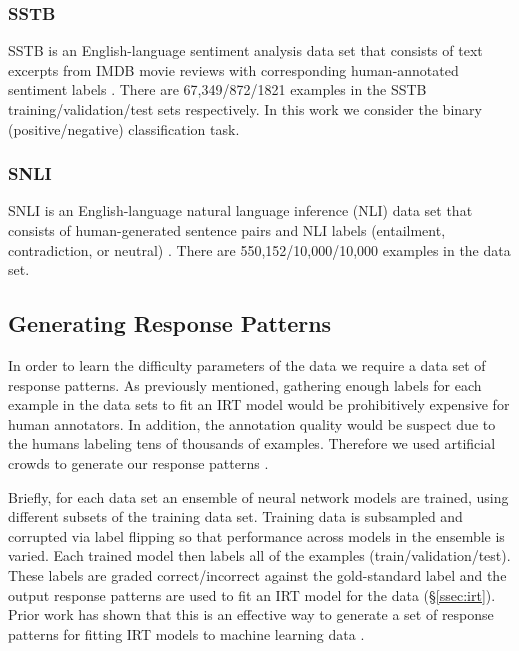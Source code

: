 \documentclass[letterpaper]{article} %
\begin{document}
\subsubsection{SSTB} 

SSTB is an English-language sentiment analysis data set that consists of text excerpts from IMDB movie reviews with corresponding human-annotated sentiment labels \cite{socher_recursive_2013}.
There are 67,349/872/1821 examples in the SSTB training/validation/test sets respectively.
In this work we consider the binary (positive/negative) classification task.

\subsubsection{SNLI} 

SNLI is an English-language natural language inference (NLI) data set that consists of human-generated sentence pairs and NLI labels (entailment, contradiction, or neutral) \cite{bowman_large_2015}.
There are 550,152/10,000/10,000 examples in the data set.

\subsection{Generating Response Patterns}

In order to learn the difficulty parameters of the data we require a data set of response patterns.
As previously mentioned, gathering enough labels for each example in the data sets to fit an IRT model would be prohibitively expensive for human annotators.
In addition, the annotation quality would be suspect due to the humans labeling tens of thousands of examples.
Therefore we used artificial crowds to generate our response patterns \cite{lalor_learning_2019}. 

Briefly, for each data set an ensemble of neural network models are trained, using different subsets of the training data set.
Training data is subsampled and corrupted via label flipping so that performance across models in the ensemble is varied.
Each trained model then labels all of the examples (train/validation/test).
These labels are graded correct/incorrect against the gold-standard label and the output response patterns are used to fit an IRT model for the data (\S \ref{ssec:irt}).
Prior work has shown that this is an effective way to generate a set of response patterns for fitting IRT models to machine learning data \cite{lalor_learning_2019}.
\end{document}
